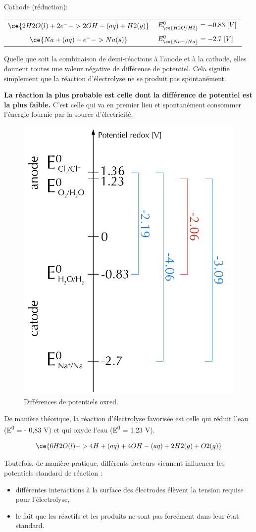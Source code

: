 \documentclass[
  11pt,
  french,
  a4paper,
  openany]{book}
\providecommand{\tightlist}{%
  \setlength{\itemsep}{0pt}\setlength{\parskip}{0pt}}
\begin{document}
Cathode (réduction):

\begin{longtable}[]{@{}cl@{}}
\toprule
\endhead
\(\ce{2H2O(l) + 2 e^- -> 2OH-(aq) + H2(g)}\) & \(E^0_{\ce{H2O/H2}} = -0.83\ [V]\)\tabularnewline
\(\ce{Na+(aq) + e^- -> Na(s)}\) & \(E^0_{\ce{Na+/Na}} = -2.7\ [V]\)\tabularnewline
\bottomrule
\end{longtable}

Quelle que soit la combinaison de demi-réactions à l'anode et à la cathode, elles donnent toutes une valeur négative de différence de potentiel. Cela signifie simplement que la réaction d'électrolyse ne se produit pas spontanément.

\textbf{La réaction la plus probable est celle dont la différence de potentiel est la plus faible.} C'est celle qui va en premier lieu et spontanément consommer l'énergie fournie par la source d'électricité.

\begin{figure}

{\centering \includegraphics[width=0.25\linewidth]{images/electrolysis-potentials} 

}

\caption{Différences de potentiels oxred.}\label{fig:electrolysis-potentials}
\end{figure}

De manière théorique, la réaction d'électrolyse favorisée est celle qui réduit l'eau (E\textsuperscript{0} = - 0,83 V) et qui oxyde l'eau (E\textsuperscript{0} = 1.23 V).

\[
\ce{6 H2O(l) -> 4 H+(aq) + 4 OH-(aq) + 2 H2(g) + O2(g)}
\]

Toutefois, de manière pratique, différents facteurs viennent influencer les potentiels standard de réaction :

\begin{itemize}
\tightlist
\item
  différentes interactions à la surface des électrodes élèvent la tension requise pour l'électrolyse,
\item
  le fait que les réactifs et les produits ne sont pas forcément dans leur état standard.
\end{itemize}
\end{document}
